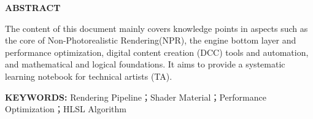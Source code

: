 \documentclass[twoside, 11pt, a4paper]{article}
\newcommand{\sihao}{\zihao{4}}
\newcommand{\xiaosi}{\zihao{-4}}
\newcommand{\wuhao}{\zihao{5}}
\newcommand{\headerfont}{\wuhao\kaishu} %
\begin{document}



\cleardoublepage %

\begin{center}
    {\sihao\bfseries ABSTRACT} 
\end{center}



\vspace{1em} %

{%
\xiaosi The content of this document mainly covers knowledge points in aspects such as the core of Non-Photorealistic Rendering(NPR), the engine bottom layer and performance optimization, digital content creation (DCC) tools and automation, and mathematical and logical foundations. It aims to provide a systematic learning notebook for technical artists (TA).
}

\vspace{1em} %

\noindent 
{\xiaosi\bfseries KEYWORDS:} 
{\xiaosi Rendering Pipeline；Shader Material；Performance Optimization；HLSL Algorithm}



\cleardoublepage
\pagestyle{fancy}   


\fancyhead[EC]{\headerfont 目\quad 录} 

\tableofcontents

\cleardoublepage
\fancyhead[EC]{\headerfont \leftmark}

\end{document}
